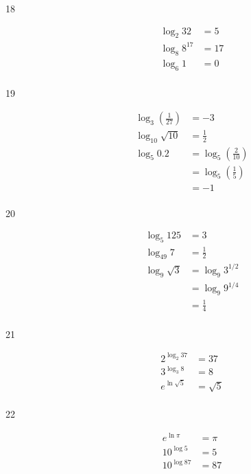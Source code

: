 \documentclass{exam}
\begin{document}
\begin{description}
    \item[18]
      \begin{align*}
        \log_2 32     &= \boxed{5} \\
        \log_8 8^{17} &= \boxed{17} \\
        \log_6 1      &= \boxed{0} \\
      \end{align*}

    \item[19]
      \begin{align*}
        \log_3 \left( \frac{1}{27} \right) &= \boxed{-3} \\
        \log_{10} \sqrt{10}                &= \boxed{\frac{1}{2}} \\
        \log_5 0.2                         &= \log_5 \left( \frac{2}{10} \right) \\
                                           &= \log_5 \left( \frac{1}{5} \right) \\
                                           &= \boxed{-1} \\
      \end{align*}

    \item[20]
      \begin{align*}
        \log_5 125      &= \boxed{3} \\
        \log_{49} 7     &= \boxed{\frac{1}{2}} \\
        \log_9 \sqrt{3} &= \log_9 3^{1/2} \\
                        &= \log_9 9^{1/4} \\
                        &= \boxed{\frac{1}{4}} \\
      \end{align*}

    \item[21]
      \begin{align*}
        2^{\log_2 37}    &= \boxed{37} \\
        3^{\log_3 8}     &= \boxed{8} \\
        e^{\ln \sqrt{5}} &= \boxed{\sqrt{5}} \\
      \end{align*}

    \item[22]
      \begin{align*}
        e^{\ln \pi}  &= \boxed{\pi} \\
        10^{\log 5}  &= \boxed{5} \\
        10^{\log 87} &= \boxed{87} \\
      \end{align*}


\end{description}
\end{document}
